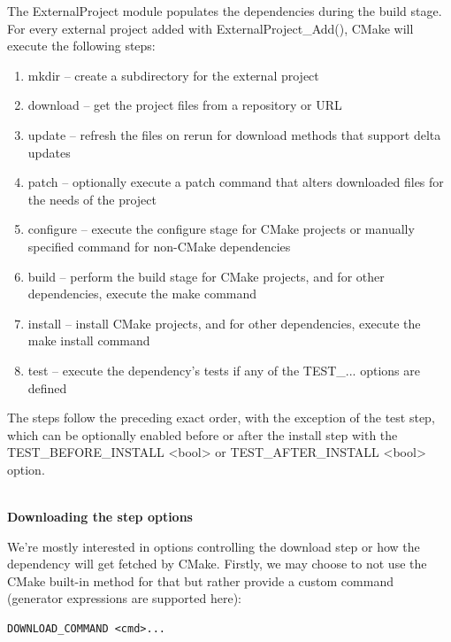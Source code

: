 The ExternalProject module populates the dependencies during the build stage. For every external project added with ExternalProject\_Add(), CMake will execute the following steps:


\begin{enumerate}
\item 
mkdir – create a subdirectory for the external project

\item 
download – get the project files from a repository or URL

\item 
update – refresh the files on rerun for download methods that support delta updates

\item 
patch – optionally execute a patch command that alters downloaded files for the needs of the project

\item 
configure – execute the configure stage for CMake projects or manually specified command for non-CMake dependencies

\item 
build – perform the build stage for CMake projects, and for other dependencies, execute the make command

\item 
install – install CMake projects, and for other dependencies, execute the make install command

\item 
test – execute the dependency's tests if any of the TEST\_... options are defined
\end{enumerate}

The steps follow the preceding exact order, with the exception of the test step, which can be optionally enabled before or after the install step with the TEST\_BEFORE\_INSTALL <bool> or TEST\_AFTER\_INSTALL <bool> option.

\hspace*{\fill} \\ %
\noindent
\textbf{Downloading the step options}

We're mostly interested in options controlling the download step or how the dependency will get fetched by CMake. Firstly, we may choose to not use the CMake built-in method for that but rather provide a custom command (generator expressions are supported here):

\begin{lstlisting}[style=styleCMake]
DOWNLOAD_COMMAND <cmd>...
\end{lstlisting} 

